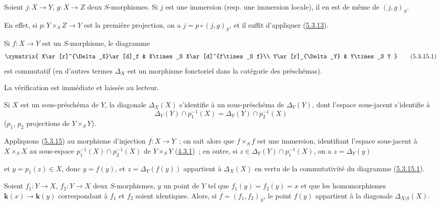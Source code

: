 \begin{corollary}[5.3.14]
\label{I.5.3.14-fr}
Soient $j:X\to Y$, $g:X\to Z$ deux $S$-morphismes. Si $j$ est une immersion
(\textup{resp.} une immersion locale), il en est de même de $(j,g)_S$.
\end{corollary}

En effet, si $p:Y\times_S Z\to Y$ est la première projection, on a
$j=p\circ(j,g)_S$, et il suffit d'appliquer
(\hyperref[I.5.3.13-fr]{5.3.13}).

\begin{proposition}[5.3.15]
\label{I.5.3.15-fr}
Si $f:X\to Y$ est un $S$-morphisme, le diagramme
\[
  \xymatrix{
    X\ar[r]^{\Delta_X}\ar[d]_f &
    X\times_S X\ar[d]^{f\times_S f}\\
    Y\ar[r]_{\Delta_Y} &
    Y\times_S Y
  }
  \tag{5.3.15.1}\label{I.5.3.15.1-fr}
\]
est commutatif \textup{(en d'autres termes $\Delta_X$ est un morphisme fonctoriel
dans la catégorie des préschémas)}.
\end{proposition}

La vérification est immédiate et laissée au lecteur.

\begin{corollary}[5.3.16]
\label{I.5.3.16-fr}
Si $X$ est un sous-préschéma de $Y$, la diagonale $\Delta_X(X)$ s'identifie à
un sous-préschéma de $\Delta_Y(Y)$, dont l'espace sous-jacent s'identifie à
\[
  \Delta_Y(Y)\cap p_1^{-1}(X)=\Delta_Y(Y)\cap p_2^{-1}(X)
\]
($p_1$, $p_2$ projections de $Y\times_S Y$).
\end{corollary}

Appliquons (\hyperref[I.5.3.15-fr]{5.3.15}) au morphisme d'injection
$f:X\to Y$~; on sait alors que $f\times_S f$ est une immersion, identifiant
l'espace sous-jacent à $X\times_S X$ au sous-espace
$p_1^{-1}(X)\cap p_2^{-1}(X)$ de $Y\times_S Y$
(\hyperref[I.4.3.1-fr]{4.3.1})~; en outre, si
$z\in\Delta_Y(Y)\cap p_1^{-1}(X)$, on a $z=\Delta_Y(y)$

et $y=p_1(z)\in X$, donc $y=f(y)$, et $z=\Delta_Y(f(y))$ appartient à
$\Delta_X(X)$ en vertu de la commutativité du diagramme
(\hyperref[I.5.3.15.1-fr]{5.3.15.1}).

\begin{corollary}[5.3.17]
\label{I.5.3.17-fr}
Soient $f_1:Y\to X$, $f_2:Y\to X$ deux $S$-morphismes, $y$ un point de $Y$
tel que $f_1(y)=f_2(y)=x$ et que les homomorphismes $\boldsymbol{k}(x)\to\boldsymbol{k}(y)$
correspondant à $f_1$ et $f_2$ soient identiques. Alors, si
$f=(f_1,f_2)_S$, le point $f(y)$ appartient à la diagonale
$\Delta_{X|S}(X)$.
\end{corollary}

